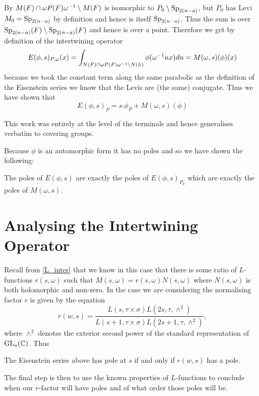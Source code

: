      By \cite[2C]{jiangPolesCertainResidual2013} \(M(F)\cap \omega P(F)\omega^{-1} \setminus M(F)\) is isomorphic to \(P_0 \setminus \operatorname{Sp}_{2(n-a)}\), but \(P_0\) has Levi \(M_0 = \operatorname{Sp}_{2(n-a)}\) by definition and hence is itself \(\operatorname{Sp}_{2(n-a)}\). Thus the sum is over \(\operatorname{Sp}_{2(n-a)}(F) \setminus \operatorname{Sp}_{2(n-a)}(F)\) and hence is over a point. Therefore we get by definition of the intertwining operator
     \[E(\phi, s)_{P, \omega}(x) = \int_{N(F)\cap \omega P(F)\omega\inv \setminus N(\A)} \phi( \omega\inv n x)  dn = M(\omega, s)(\phi)(x)\]
     because we took the constant term along the same parabolic as the definition of the Eisenstein series we know that the Levis are (the same) conjugate.
    Thus we have shown that 
    \[E(\phi, s)_P = s.\phi_P + M(\omega, s )(\phi)\]
    \begin{remark}
        This work was entirely at the level of the terminals and hence generalises verbatim to covering groups.
    \end{remark}
    
    Because \(\phi\) is an automorphic form it has no poles and so we have shown the following:
    \begin{Lemma}
        The poles of \(E(\phi, s)\) are exactly the poles of \(E(\phi,s)_{P_a}\) which are exactly the poles of \(M(\omega, s)\).
    \end{Lemma}
    

    \section{Analysing the Intertwining Operator}
    Recall from \ref{L_inter} that we know in this case that there is some ratio of \(L\)-functions \(r(s, \omega)\) such that \(M(s,\omega) = r(s, \omega)N(s, \omega)\) where \(N(s, \omega)\) is both holomorphic and non-zero. 
     In the case we are considering the normalising factor \(r\) is given by the equation \cite[4A]{jiangPolesCertainResidual2013}
     \[r(w, s) = \frac{L(s, \tau\times \sigma)L(2s, \tau,\wedge^2)}{L(s+1, \tau\times \sigma)L(2s+1, \tau, \wedge^2)},\]
    where \(\wedge^2\) denotes the exterior second power of the standard representation of \(\GL_a(\C)\). Thus

     \begin{Lemma}
        The Eisenstein series above has pole at \(s\) if and only if \(r(w,s)\) has a pole.
     \end{Lemma}
     The final step is then to use the known properties of \(L\)-functions to conclude when our \(r\)-factor will have poles and of what order those poles will be.

